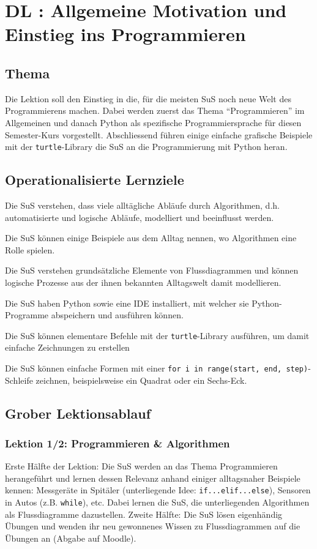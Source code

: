 \section{DL \themycounter: Allgemeine Motivation und Einstieg ins Programmieren}
\begin{myExBox}[title=DL \themycounter]
\subsection*{Thema}
Die Lektion soll den Einstieg in die, für die meisten SuS noch neue Welt des Programmierens machen. Dabei werden zuerst das Thema ``Programmieren'' im Allgemeinen und danach Python als spezifische Programmiersprache für diesen Semester-Kurs vorgestellt. Abschliessend führen einige einfache grafische Beispiele mit der \lstinline|turtle|-Library die SuS an die Programmierung mit Python heran.


\subsection*{Operationalisierte Lernziele}
\begin{todolist}
    \item Die SuS verstehen, dass viele alltägliche Abläufe durch Algorithmen, d.h. automatisierte und logische Abläufe, modelliert und beeinflusst werden.
    \item Die SuS können einige Beispiele aus dem Alltag nennen, wo Algorithmen eine Rolle spielen.
    \item Die SuS verstehen grundsätzliche Elemente von Flussdiagrammen und können logische Prozesse aus der ihnen bekannten Alltagswelt damit modellieren.
    \item Die SuS haben Python sowie eine IDE installiert, mit welcher sie Python-Programme abspeichern und ausführen können.
    \item Die SuS können elementare Befehle mit der \lstinline|turtle|-Library ausführen, um damit einfache Zeichnungen zu erstellen
    \item Die SuS können einfache Formen mit einer \lstinline|for i in range(start, end, step)|-Schleife zeichnen, beispielsweise ein Quadrat oder ein Sechs-Eck.
\end{todolist}

\subsection*{Grober Lektionsablauf}
\subsubsection*{Lektion 1/2: Programmieren \& Algorithmen}
Erste Hälfte der Lektion: Die SuS werden an das Thema Programmieren herangeführt und lernen dessen Relevanz anhand einiger alltagsnaher Beispiele kennen: Messgeräte in Spitäler (unterliegende Idee: \lstinline|if...elif...else|), Sensoren in Autos (z.B. \lstinline|while|), etc. Dabei lernen die SuS, die unterliegenden Algorithmen als Flussdiagramme dazustellen. Zweite Hälfte: Die SuS lösen eigenhändig Übungen und wenden ihr neu gewonnenes Wissen zu Flussdiagrammen auf die Übungen an (Abgabe auf Moodle).


\end{myExBox}
